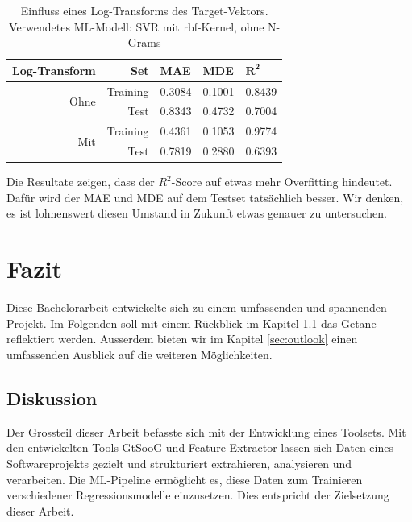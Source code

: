 \documentclass[10pt, a4paper]{article}
\begin{document}
\begin{table}[ht]
	\begin{tabular}[c]{|r|r|l|l|l|}
		\hline
		\textbf{Log-Transform}	& \textbf{Set} & \textbf{MAE}	& \textbf{MDE}	& \(\mathbf{R^2}\) \\ \hline
		\multirow{2}{*}{Ohne}
		& Training 	& 0.3084 & 0.1001 & 0.8439 \\ \cline{2-5}
		& Test 		& 0.8343 & 0.4732 & 0.7004 \\ \hline
		\multirow{2}{*}{Mit}
		& Training 	& 0.4361 & 0.1053 & 0.9774 \\ \cline{2-5}
		& Test 		& 0.7819 & 0.2880 & 0.6393 \\ \hline
	\end{tabular}
	\centering
	\caption{Einfluss eines Log-Transforms des Target-Vektors. Verwendetes \ac{ML}-Modell: SVR mit rbf-Kernel, ohne N-Grams}
	\label{tab:log_transform_experiment}
\end{table}

Die Resultate zeigen, dass der \(R^2\)-Score auf etwas mehr Overfitting hindeutet. Dafür wird der \ac{MAE} und \ac{MDE} auf dem Testset tatsächlich besser. Wir denken, es ist lohnenswert diesen Umstand in Zukunft etwas genauer zu untersuchen.


\section{Fazit}

Diese Bachelorarbeit entwickelte sich zu einem umfassenden und spannenden Projekt. Im Folgenden soll mit einem Rückblick im Kapitel \ref{sec:discussion} das Getane reflektiert werden. Ausserdem bieten wir im Kapitel \ref{sec:outlook} einen umfassenden Ausblick auf die weiteren Möglichkeiten.

\subsection{Diskussion} \label{sec:discussion}

Der Grossteil dieser Arbeit befasste sich mit der Entwicklung eines Toolsets. Mit den entwickelten Tools GtSooG und Feature Extractor lassen sich Daten eines Softwareprojekts gezielt und strukturiert extrahieren, analysieren und verarbeiten. Die ML-Pipeline ermöglicht es, diese Daten zum Trainieren verschiedener Regressionsmodelle einzusetzen. Dies entspricht der Zielsetzung dieser Arbeit.
\end{document}
